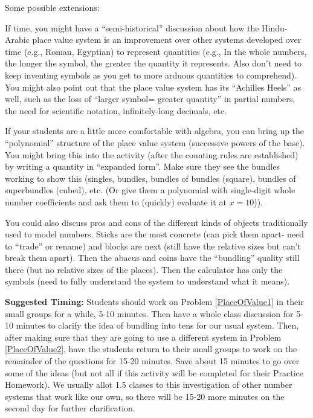 \documentclass{ximera}
\begin{document}
\begin{instructorNotes}
Some possible extensions:

If time, you might have a ``semi-historical'' discussion about how the Hindu-Arabic place value system is an improvement over other systems developed over time (e.g., Roman, Egyptian) to represent quantities (e.g., In the whole numbers, the longer the symbol, the greater the quantity it represents.  Also don't need to keep inventing symbols as you get to more arduous quantities to comprehend).  You might also point out that the place value system has its ``Achilles Heels'' as well, such as the loss of ``larger symbol= greater quantity'' in partial numbers, the need for scientific notation, infinitely-long decimals, etc.  

If your students are a little more comfortable with algebra, you can bring up the ``polynomial'' structure of the place value system (successive powers of the base).  You might bring this into the activity (after the counting rules are established) by writing a quantity in ``expanded form''.  Make sure they see the bundles working to show this (singles, bundles, bundles of bundles (square), bundles of superbundles (cubed), etc. (Or give them a polynomial with single-digit whole number coefficients and ask them to (quickly) evaluate it at $x = 10$)).

You could also discuss pros and cons of the different kinds of objects traditionally used to model numbers.  Sticks are the most concrete (can pick them apart- need to ``trade'' or rename) and blocks are next (still have the relative sizes but can't break them apart).  Then the abacus and coins have the ``bundling'' quality still there (but no relative sizes of the places).  Then the calculator has only the symbols (need to fully understand the system to understand what it means).


{\bf Suggested Timing:} Students should work on Problem \ref{PlaceOfValue1} in their small groups for a while, 5-10 minutes.  Then have a whole class discussion for 5-10 minutes to clarify the idea of bundling into tens for our usual system.  Then, after making sure that they are going to use a different system in Problem \ref{PlaceOfValue2}, have the students return to their small groups to work on the remainder of the questions for 15-20 minutes.  Save about 15 minutes to go over some of the ideas (but not all if this activity will be completed for their Practice Homework).  We usually allot 1.5 classes to this investigation of other number systems that work like our own, so there will be 15-20 more minutes on the second day for further clarification.

\end{instructorNotes}
\end{document}
